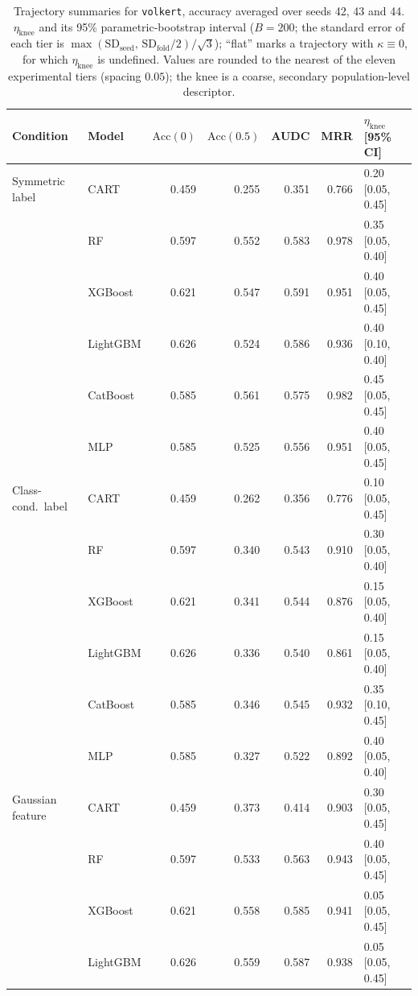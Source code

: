 \documentclass[pdflatex,sn-mathphys]{sn-jnl}
\theoremstyle{thmstyleone}
\begin{document}
\begin{table}[htbp]
\centering
\scriptsize
\setlength{\tabcolsep}{3.5pt}
\caption{Trajectory summaries for \texttt{volkert}, accuracy averaged over seeds 42, 43 and 44. $\eta_{\mathrm{knee}}$ and its 95\% parametric-bootstrap interval ($B=200$; the standard error of each tier is $\max(\mathrm{SD}_{\mathrm{seed}},\,\mathrm{SD}_{\mathrm{fold}}/2)/\sqrt3$); ``flat'' marks a trajectory with $\kappa\equiv 0$, for which $\eta_{\mathrm{knee}}$ is undefined. Values are rounded to the nearest of the eleven experimental tiers (spacing $0.05$); the knee is a coarse, secondary population-level descriptor.}
\label{tab:traj_volkert}
\begin{tabular}{@{}llrrrrl@{}}
\toprule
Condition & Model & $\mathrm{Acc}(0)$ & $\mathrm{Acc}(0.5)$ & AUDC & MRR & $\eta_{\mathrm{knee}}$ [95\% CI] \\
\midrule
Symmetric label & CART & 0.459 & 0.255 & 0.351 & 0.766 & 0.20 [0.05, 0.45] \\
 & RF & 0.597 & 0.552 & 0.583 & 0.978 & 0.35 [0.05, 0.40] \\
 & XGBoost & 0.621 & 0.547 & 0.591 & 0.951 & 0.40 [0.05, 0.45] \\
 & LightGBM & 0.626 & 0.524 & 0.586 & 0.936 & 0.40 [0.10, 0.40] \\
 & CatBoost & 0.585 & 0.561 & 0.575 & 0.982 & 0.45 [0.05, 0.45] \\
 & MLP & 0.585 & 0.525 & 0.556 & 0.951 & 0.40 [0.05, 0.45] \\
\midrule
Class-cond.\ label & CART & 0.459 & 0.262 & 0.356 & 0.776 & 0.10 [0.05, 0.45] \\
 & RF & 0.597 & 0.340 & 0.543 & 0.910 & 0.30 [0.05, 0.40] \\
 & XGBoost & 0.621 & 0.341 & 0.544 & 0.876 & 0.15 [0.05, 0.40] \\
 & LightGBM & 0.626 & 0.336 & 0.540 & 0.861 & 0.15 [0.05, 0.40] \\
 & CatBoost & 0.585 & 0.346 & 0.545 & 0.932 & 0.35 [0.10, 0.45] \\
 & MLP & 0.585 & 0.327 & 0.522 & 0.892 & 0.40 [0.05, 0.40] \\
\midrule
Gaussian feature & CART & 0.459 & 0.373 & 0.414 & 0.903 & 0.30 [0.05, 0.45] \\
 & RF & 0.597 & 0.533 & 0.563 & 0.943 & 0.40 [0.05, 0.45] \\
 & XGBoost & 0.621 & 0.558 & 0.585 & 0.941 & 0.05 [0.05, 0.45] \\
 & LightGBM & 0.626 & 0.559 & 0.587 & 0.938 & 0.05 [0.05, 0.45] \\

\end{tabular}
\end{table}
\end{document}
